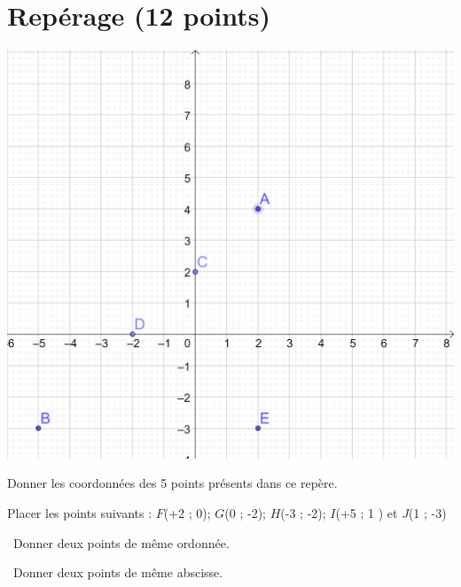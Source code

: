 	\section{Repérage (12 points)}


\begin{center}
	\includegraphics[scale=0.135]{img/grille2}
\end{center}

\begin{questions}
	
	\question[5] Donner les coordonnées des 5 points présents dans ce repère.
	\fillwithdottedlines{2cm}
	
	\question[5] Placer les points suivants :
	$F$(+2 ; 0); $G$(0 ; -2);  $H$(-3 ; -2);  $I$(+5 ; 1 ) et  $J$(1 ; -3)
	
	
	\question[1]  Donner deux points de même ordonnée.
	\fillwithdottedlines{1.5cm}
	\begin{solution}
		
	\end{solution}
	
	
	\question[2]  Donner deux points de même abscisse.
	\fillwithdottedlines{1.5cm}
	\begin{solution}
		
	\end{solution}
	
	
\end{questions}

